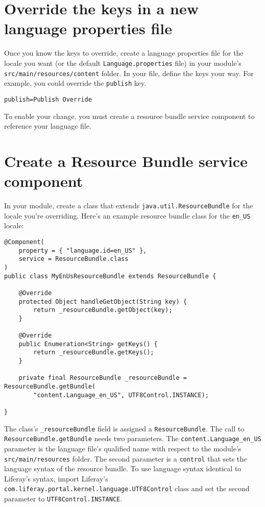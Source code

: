 \section{Override the keys in a new language properties
file}\label{override-the-keys-in-a-new-language-properties-file}

Once you know the keys to override, create a language properties file
for the locale you want (or the default \texttt{Language.properties}
file) in your module's \texttt{src/main/resources/content} folder. In
your file, define the keys your way. For example, you could override the
\texttt{publish} key.

\begin{verbatim}
publish=Publish Override
\end{verbatim}

To enable your change, you must create a resource bundle service
component to reference your language file.

\section{Create a Resource Bundle service
component}\label{create-a-resource-bundle-service-component}

In your module, create a class that extends
\texttt{java.util.ResourceBundle} for the locale you're overriding.
Here's an example resource bundle class for the \texttt{en\_US} locale:

\begin{verbatim}
@Component(
    property = { "language.id=en_US" }, 
    service = ResourceBundle.class
)
public class MyEnUsResourceBundle extends ResourceBundle {

    @Override
    protected Object handleGetObject(String key) {
        return _resourceBundle.getObject(key);
    }

    @Override
    public Enumeration<String> getKeys() {
        return _resourceBundle.getKeys();
    }

    private final ResourceBundle _resourceBundle = ResourceBundle.getBundle(
        "content.Language_en_US", UTF8Control.INSTANCE);

}
\end{verbatim}

The class's \texttt{\_resourceBundle} field is assigned a
\texttt{ResourceBundle}. The call to \texttt{ResourceBundle.getBundle}
needs two parameters. The \texttt{content.Language\_en\_US} parameter is
the language file's qualified name with respect to the module's
\texttt{src/main/resources} folder. The second parameter is a
\texttt{control} that sets the language syntax of the resource bundle.
To use language syntax identical to Liferay's syntax, import Liferay's
\texttt{com.liferay.portal.kernel.language.UTF8Control} class and set
the second parameter to \texttt{UTF8Control.INSTANCE}.

